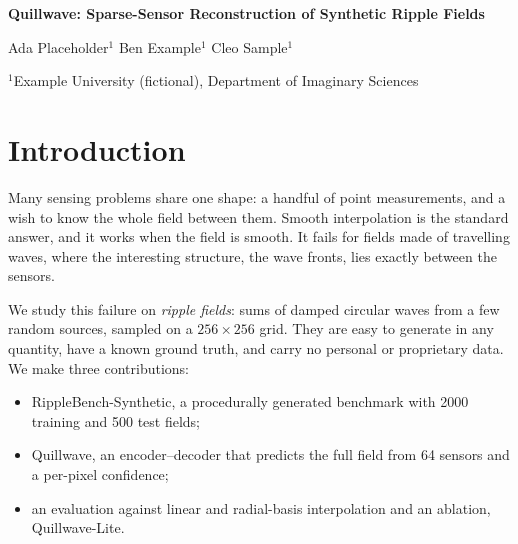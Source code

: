 \documentclass[11pt,a4paper]{article}
\begin{document}
\begin{center}
{\LARGE\bfseries Quillwave: Sparse-Sensor Reconstruction of Synthetic Ripple Fields\par}\vspace{10pt}
{\large Ada Placeholder$^{1}$ \quad Ben Example$^{1}$ \quad Cleo Sample$^{1}$\par}\vspace{4pt}
{\small $^{1}$Example University (fictional), Department of Imaginary Sciences\par}
\vspace{4pt}{\small Accepted at FCSV 2026 (Fictional Conference on Synthetic Vision).\par}
\end{center}
\begin{abstract}
Quillwave reconstructs a full $256\times256$ ripple field from 64 point sensors. Ripple
fields are procedurally generated sums of interfering circular waves: cheap to synthesise, but hard to
interpolate, because the wave fronts between sensors are lost by smooth interpolation. Quillwave encodes the
sensor readings into a 128-dimensional latent field code and decodes it with a coordinate-based field
decoder. On RippleBench-Synthetic, a benchmark of 500 synthetic test fields generated for this work,
Quillwave reaches 29.46\,dB PSNR and 0.887 SSIM, 5.41\,dB above radial-basis interpolation (the
best baseline), which is a 71.2\,\% lower mean squared error. It is also 1.36$\times$ faster than
radial-basis interpolation at inference. All results are on synthetic fields only.
\end{abstract}

\section{Introduction}
Many sensing problems share one shape: a handful of point measurements, and a wish to know the
whole field between them. Smooth interpolation is the standard answer, and it works when the field is
smooth. It fails for fields made of travelling waves, where the interesting structure, the wave fronts,
lies exactly between the sensors.

We study this failure on \emph{ripple fields}: sums of damped circular waves from a few random sources,
sampled on a $256\times256$ grid. They are easy to generate in any quantity, have a known ground truth,
and carry no personal or proprietary data. We make three contributions:
\begin{itemize}
\item RippleBench-Synthetic, a procedurally generated benchmark with 2000 training and 500 test fields;
\item Quillwave, an encoder--decoder that predicts the full field from 64 sensors and a per-pixel confidence;
\item an evaluation against linear and radial-basis interpolation and an ablation, Quillwave-Lite.
\end{itemize}
\end{document}
